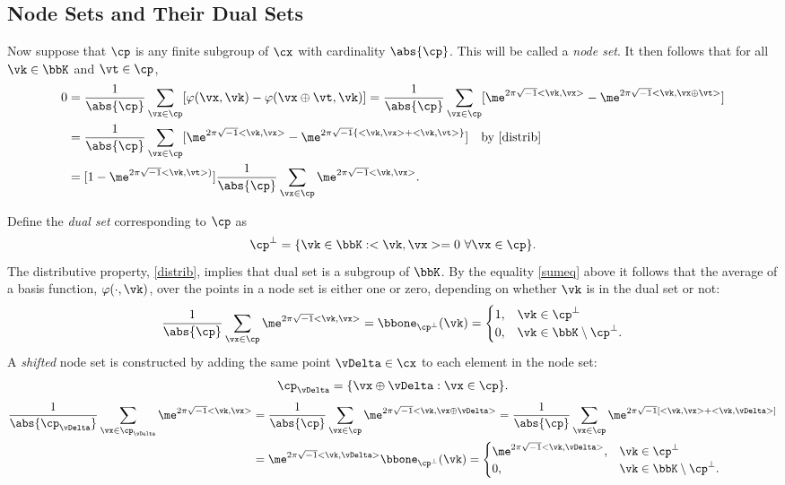 \documentclass[]{elsarticle}
\theoremstyle{definition}
\theoremstyle{remark}
\begin{document}
\subsection{Node Sets and Their Dual Sets} Now suppose that $\cp$ is any finite subgroup of $\cx$ with cardinality $\abs{\cp}$.  This will be called a \emph{node set}.  It then follows that for all $\vk \in \bbK$ and $\vt \in \cp$,
\begin{align}
\nonumber
0 & = \frac{1}{\abs{\cp}} \sum_{\vx \in \cp} [\varphi(\vx,\vk) - \varphi(\vx \oplus \vt,\vk)]  = \frac{1}{\abs{\cp}} \sum_{\vx \in \cp} [\me^{2 \pi \sqrt{-1} <\vk , \vx>} - \me^{2 \pi \sqrt{-1} <\vk , \vx \oplus \vt>}]\\
\nonumber
& = \frac{1}{\abs{\cp}} \sum_{\vx \in \cp} [\me^{2 \pi \sqrt{-1} <\vk , \vx>} - \me^{2 \pi \sqrt{-1} \{<\vk , \vx> + <\vk ,\vt>\}}] \quad \text{by } \eqref{distrib}\\
\label{sumeq}
& = [1 - \me^{2 \pi \sqrt{-1} <\vk ,\vt>)}] \frac{1}{\abs{\cp}} \sum_{\vx \in \cp} \me^{2 \pi \sqrt{-1} <\vk , \vx>}.
\end{align}

Define the \emph{dual set} corresponding to $\cp$ as
\begin{equation*}
\cp^{\perp} = \{\vk \in \bbK : <\vk , \vx> = 0 \ \forall \vx \in \cp\}.
\end{equation*}
The distributive property, \eqref{distrib}, implies that dual set is a subgroup of $\bbK$.  By the equality \eqref{sumeq} above it follows that the average of a basis function, $\varphi(\cdot,\vk)$, over the points in a node set is either one or zero, depending on whether $\vk$ is in the dual set or not:
\begin{equation*}
 \frac{1}{\abs{\cp}} \sum_{\vx \in \cp} \me^{2 \pi \sqrt{-1} <\vk , \vx>} = \bbone_{\cp^{\perp}}(\vk) = \begin{cases} 1 , & \vk \in \cp^{\perp}\\
 0,  & \vk \in \bbK \setminus \cp^{\perp}.
 \end{cases}
\end{equation*}
A \emph{shifted} node set is constructed by adding the same point $\vDelta \in \cx$ to each element in the node set:
\begin{equation*}
\cp_{\vDelta} = \{ \vx \oplus \vDelta : \vx \in \cp\}.
\end{equation*}
\begin{align*}
\frac{1}{\abs{\cp_{\vDelta}}} \sum_{\vx \in \cp_{\vDelta}} \me^{2 \pi \sqrt{-1} <\vk , \vx>}
& = \frac{1}{\abs{\cp}} \sum_{\vx \in \cp} \me^{2 \pi \sqrt{-1} <\vk , \vx \oplus \vDelta>} = \frac{1}{\abs{\cp}} \sum_{\vx \in \cp} \me^{2 \pi \sqrt{-1} [<\vk , \vx> + <\vk , \vDelta>]}\\
&= \me^{2 \pi \sqrt{-1} <\vk , \vDelta>} \bbone_{\cp^{\perp}}(\vk) = \begin{cases} \me^{2 \pi \sqrt{-1} <\vk , \vDelta>} , & \vk \in \cp^{\perp}\\
 0,  & \vk \in \bbK \setminus \cp^{\perp}.
 \end{cases}
\end{align*}
\end{document}
